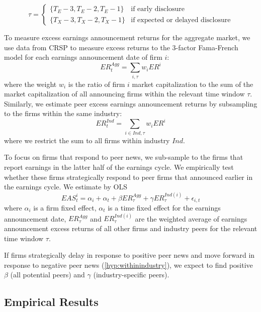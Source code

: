 \documentclass[authoryear,letterpaper,english,12pt]{elsarticle}
\begin{document}
\begin{equation}
      \tau=
    \begin{cases}
      \{T_{E}-3,T_{E}-2,T_{E}-1\} & \text{if early disclosure}\\
      \{T_{X}-3,T_{X}-2,T_{X}-1\} & \text{if expected or delayed disclosure}
    \end{cases}     
\end{equation}

To measure excess earnings announcement returns for the aggregate market, we use data from CRSP to measure excess returns to the 3-factor Fama-French model for each earnings announcement date of firm $i$:  
\begin{equation}
    ER^{Agg}_{t}= \sum_{i, \tau} w_{i} ER^{i}
\end{equation}
where the weight $w_i$ is the ratio of firm $i$ market capitalization to the sum of the market capitalization of all announcing firms within the relevant time window $\tau$. Similarly, we estimate peer excess earnings announcement returns by subsampling to the firms within the same industry: 
\begin{equation}
    ER^{Ind}_{t}= \sum_{i\in Ind,\tau} w_{i} ER^{i}
\end{equation}
where we restrict the sum to all firms within industry $Ind$. 

To focus on firms that respond to peer news, we sub-sample to the firms that report earnings in the latter half of the earnings cycle. We empirically test whether these firms strategically respond to peer firms that announced earlier in the earnings cycle. We estimate by OLS
\begin{equation} \label{eq:withinindustry}
    EAS^{i}_{t} = \alpha_{i} +\alpha_{t} + \beta ER^{Agg}_{\tau} + \gamma  ER^{Ind(i)}_{\tau}  + \epsilon_{i,t}
\end{equation}
where $\alpha_{i}$ is a firm fixed effect, $\alpha_{t}$ is a time fixed effect for the earnings announcement date, $ER^{Agg}_{\tau}$ and $ER^{Ind(i)}_{\tau}$ are the weighted average of earnings announcement excess returns of all other firms and industry peers for the relevant time window $\tau$. 

If firms strategically delay in response to positive peer news and move forward in response to negative peer news (\ref{hyp:withinindustry}), we expect to find positive $\beta$ (all potential peers) and $\gamma$ (industry-specific peers). 


\subsection{Empirical Results}\label{ss:empiricalresults}
\end{document}
